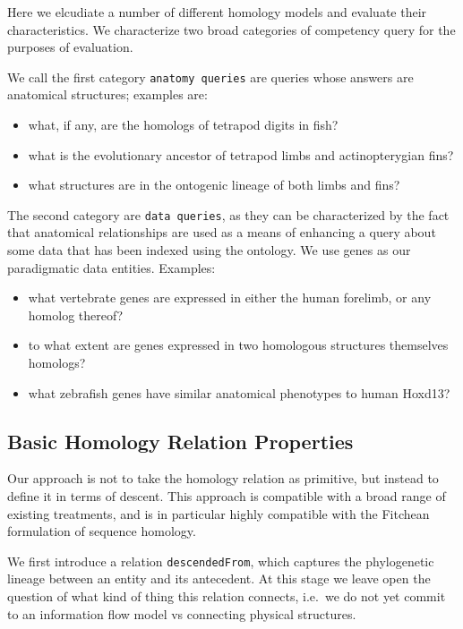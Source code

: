 Here we elcudiate a number of different homology models and evaluate
their characteristics. We characterize two broad categories of
competency query for the purposes of evaluation.

We call the first category \texttt{anatomy queries} are queries whose
answers are anatomical structures; examples are:

\begin{itemize}
\itemsep1pt\parskip0pt
\item
  what, if any, are the homologs of tetrapod digits in fish?
\item
  what is the evolutionary ancestor of tetrapod limbs and
  actinopterygian fins?
\item
  what structures are in the ontogenic lineage of both limbs and fins?
\end{itemize}

The second category are \texttt{data queries}, as they can be
characterized by the fact that anatomical relationships are used as a
means of enhancing a query about some data that has been indexed using
the ontology. We use genes as our paradigmatic data entities. Examples:

\begin{itemize}
\itemsep1pt\parskip0pt
\item
  what vertebrate genes are expressed in either the human forelimb, or
  any homolog thereof?
\item
  to what extent are genes expressed in two homologous structures
  themselves homologs?
\item
  what zebrafish genes have similar anatomical phenotypes to human
  Hoxd13?
\end{itemize}

\subsection{Basic Homology Relation
Properties}\label{basic-homology-relation-properties}

Our approach is not to take the homology relation as primitive, but
instead to define it in terms of descent. This approach is compatible
with a broad range of existing treatments, and is in particular highly
compatible with the Fitchean formulation of sequence homology.

We first introduce a relation \texttt{descendedFrom}, which captures the
phylogenetic lineage between an entity and its antecedent. At this stage
we leave open the question of what kind of thing this relation connects,
i.e.~we do not yet commit to an information flow model\cite{Van Valen}
vs connecting physical structures.

